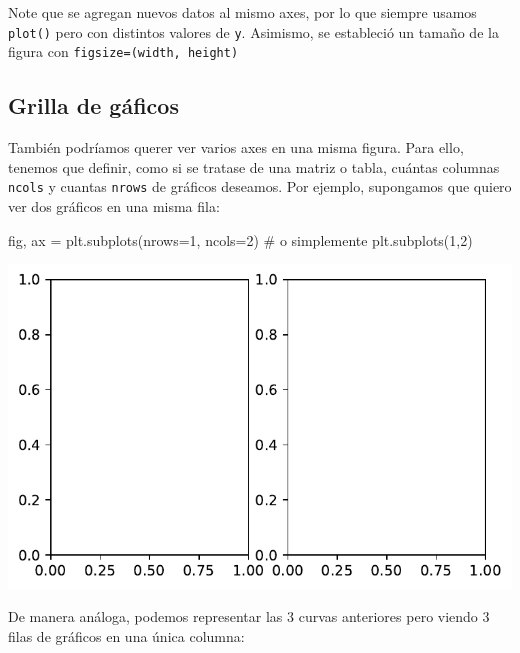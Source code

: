 \documentclass[
  letterpaper,
  DIV=11,
  numbers=noendperiod]{scrreprt}
\newenvironment{Shaded}{\begin{snugshade}}{\end{snugshade}}
\newcommand{\CommentTok}[1]{\textcolor[rgb]{0.37,0.37,0.37}{#1}}
\newcommand{\DecValTok}[1]{\textcolor[rgb]{0.68,0.00,0.00}{#1}}
\newcommand{\NormalTok}[1]{\textcolor[rgb]{0.00,0.23,0.31}{#1}}
\newcommand{\OperatorTok}[1]{\textcolor[rgb]{0.37,0.37,0.37}{#1}}
\begin{document}
Note que se agregan nuevos datos al mismo axes, por lo que siempre
usamos \texttt{plot()} pero con distintos valores de \texttt{y}.
Asimismo, se estableció un tamaño de la figura con
\texttt{figsize=(width,\ height)}

\subsection{Grilla de gáficos}\label{grilla-de-guxe1ficos}

También podríamos querer ver varios axes en una misma figura. Para ello,
tenemos que definir, como si se tratase de una matriz o tabla, cuántas
columnas \texttt{ncols} y cuantas \texttt{nrows} de gráficos deseamos.
Por ejemplo, supongamos que quiero ver dos gráficos en una misma fila:

\begin{Shaded}
\begin{Highlighting}[]
\NormalTok{fig, ax }\OperatorTok{=}\NormalTok{ plt.subplots(nrows}\OperatorTok{=}\DecValTok{1}\NormalTok{, ncols}\OperatorTok{=}\DecValTok{2}\NormalTok{)   }\CommentTok{\# o simplemente plt.subplots(1,2)}
\end{Highlighting}
\end{Shaded}

\includegraphics{unidad_6_files/figure-pdf/cell-123-output-1.pdf}

De manera análoga, podemos representar las 3 curvas anteriores pero
viendo 3 filas de gráficos en una única columna:
\end{document}
